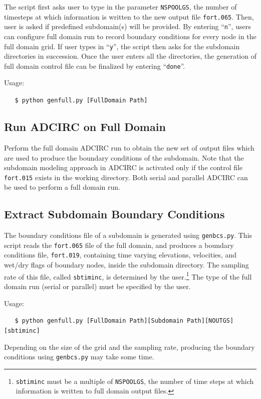 \documentclass[11pt,titlepage]{article}
\begin{document}
 The script first asks user to type in the parameter \texttt{NSPOOLGS}, the number of timesteps at which information is written to the new output file \texttt{fort.065}. Then, user is asked if predefined subdomain(s) will be provided. By entering ``\texttt{n}'', users can configure full domain run to record boundary conditions for every node in the full domain grid. If user types in ``\texttt{y}'', the script then asks for the subdomain directories in succession. Once the user enters all the directories, the generation of full domain control file can be finalized by entering ``\texttt{done}''.

  Usage:

  \verb+   $ python genfull.py [FullDomain Path]+

\subsection{Run ADCIRC on Full Domain}

Perform the full domain ADCIRC run to obtain the new set of output
files which are used to produce the boundary conditions of the
subdomain. Note that the subdomain modeling approach in ADCIRC is
activated only if the control file \verb+fort.015+ exists in the
working directory. Both serial and parallel ADCIRC can be used to
perform a full domain run.

\subsection{Extract Subdomain Boundary Conditions}

The boundary conditions file of a subdomain is generated using
\verb+genbcs.py+. This script reads the \verb+fort.065+ file of the 
full domain, and
produces a boundary conditions file, \verb+fort.019+, containing time
varying elevations, velocities, and wet/dry flags of boundary nodes,
inside the subdomain directory. The sampling rate of this file, called
\texttt{sbtiminc}, is determined by the
user.\footnote{\texttt{sbtiminc} must be a multiple of
\texttt{NSPOOLGS}, the number of time steps at which information is
written to full domain output files.}  The type of the full domain
run (serial or parallel) must be specified by the user.

  Usage:

  \verb+   $ python genfull.py [FullDomain Path][Subdomain Path][NOUTGS][sbtiminc]+

\mbox{}

Depending on the size of the grid and the sampling rate, producing the
boundary conditions using \verb+genbcs.py+ may take some time.
\end{document}
